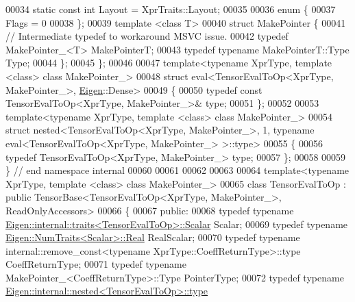 \begin{DoxyCode}
00034   \textcolor{keyword}{static} \textcolor{keyword}{const} \textcolor{keywordtype}{int} Layout = XprTraits::Layout;
00035 
00036   \textcolor{keyword}{enum} \{
00037     Flags = 0
00038   \};
00039   \textcolor{keyword}{template} <\textcolor{keyword}{class} T>
00040   \textcolor{keyword}{struct }MakePointer \{
00041     \textcolor{comment}{// Intermediate typedef to workaround MSVC issue.}
00042     \textcolor{keyword}{typedef} MakePointer\_<T> MakePointerT;
00043     \textcolor{keyword}{typedef} \textcolor{keyword}{typename} MakePointerT::Type Type;
00044   \};
00045 \};
00046 
00047 \textcolor{keyword}{template}<\textcolor{keyword}{typename} XprType, \textcolor{keyword}{template} <\textcolor{keyword}{class}> \textcolor{keyword}{class }MakePointer\_>
00048 \textcolor{keyword}{struct }eval<TensorEvalToOp<XprType, MakePointer\_>, \hyperlink{namespace_eigen}{Eigen}::Dense>
00049 \{
00050   \textcolor{keyword}{typedef} \textcolor{keyword}{const} TensorEvalToOp<XprType, MakePointer\_>& type;
00051 \};
00052 
00053 \textcolor{keyword}{template}<\textcolor{keyword}{typename} XprType, \textcolor{keyword}{template} <\textcolor{keyword}{class}> \textcolor{keyword}{class }MakePointer\_>
00054 \textcolor{keyword}{struct }nested<TensorEvalToOp<XprType, MakePointer\_>, 1, typename eval<TensorEvalToOp<XprType, MakePointer\_>
       >::type>
00055 \{
00056   \textcolor{keyword}{typedef} TensorEvalToOp<XprType, MakePointer\_> type;
00057 \};
00058 
00059 \}  \textcolor{comment}{// end namespace internal}
00060 
00061 
00062 
00063 
00064 \textcolor{keyword}{template}<\textcolor{keyword}{typename} XprType, \textcolor{keyword}{template} <\textcolor{keyword}{class}> \textcolor{keyword}{class }MakePointer\_>
00065 \textcolor{keyword}{class }TensorEvalToOp : \textcolor{keyword}{public} TensorBase<TensorEvalToOp<XprType, MakePointer\_>, ReadOnlyAccessors>
00066 \{
00067   \textcolor{keyword}{public}:
00068   \textcolor{keyword}{typedef} \textcolor{keyword}{typename} \hyperlink{struct_eigen_1_1internal_1_1traits}{Eigen::internal::traits<TensorEvalToOp>::Scalar}
       Scalar;
00069   \textcolor{keyword}{typedef} \textcolor{keyword}{typename} \hyperlink{group___sparse_core___module}{Eigen::NumTraits<Scalar>::Real} RealScalar;
00070   \textcolor{keyword}{typedef} \textcolor{keyword}{typename} internal::remove\_const<typename XprType::CoeffReturnType>::type CoeffReturnType;
00071   \textcolor{keyword}{typedef} \textcolor{keyword}{typename} MakePointer\_<CoeffReturnType>::Type PointerType;
00072   \textcolor{keyword}{typedef} \textcolor{keyword}{typename} \hyperlink{class_eigen_1_1internal_1_1_tensor_lazy_evaluator_writable}{Eigen::internal::nested<TensorEvalToOp>::type}

\end{DoxyCode}
